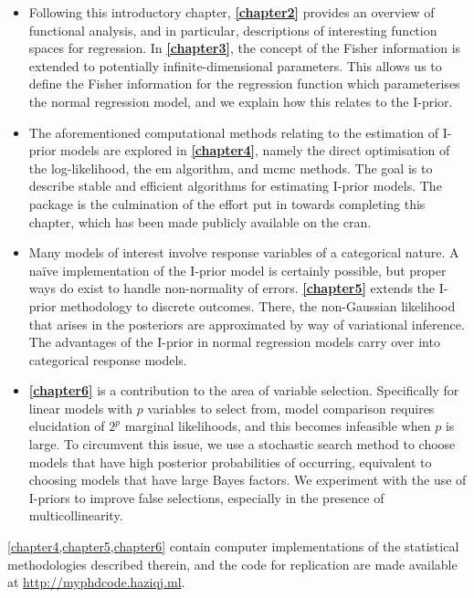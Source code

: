 \documentclass[11pt,twoside,openright,showframe]{report}
\begin{document}
\begin{itemize}
  \item Following this introductory chapter, \textbf{\cref{chapter2}} provides an overview of functional analysis, and in particular, descriptions of interesting function spaces for regression.
  In \textbf{\cref{chapter3}}, the concept of the Fisher information is extended to potentially infinite-dimensional parameters.
  This allows us to define the Fisher information for the regression function which parameterises the normal regression model, and we explain how this relates to the I-prior.
  
  \item The aforementioned computational methods relating to the estimation of I-prior models are explored in \textbf{\cref{chapter4}}, namely the direct optimisation of the log-likelihood, the \gls*{em} algorithm, and \gls*{mcmc} methods.
  The goal is to describe stable and efficient algorithms for estimating I-prior models.
  The  package  \citep{jamil2017iprior} is the culmination of the effort put in towards completing this chapter, which has been made publicly available on the \gls*{cran}.

  \item Many models of interest involve response variables of a categorical nature.
  A naïve implementation of the I-prior model is certainly possible, but proper ways do exist to handle non-normality of errors.
  \textbf{\cref{chapter5}} extends the I-prior methodology to discrete outcomes.
  There, the non-Gaussian likelihood that arises in the posteriors are approximated by way of variational inference.
  The advantages of the I-prior in normal regression models carry over into categorical response models.

  \item \textbf{\cref{chapter6}} is a contribution to the area of variable selection.
  Specifically for linear models with $p$ variables to select from, model comparison requires elucidation of $2^p$ marginal likelihoods, and this becomes infeasible when $p$ is large.
  To circumvent this issue, we use a stochastic search method to choose models that have high posterior probabilities of occurring, equivalent to choosing models that have large Bayes factors.
  We experiment with the use of I-priors to improve false selections, especially in the presence of multicollinearity.
\end{itemize}

\cref{chapter4,chapter5,chapter6} contain  computer implementations of the statistical methodologies described therein, and the code for replication are made available at \url{http://myphdcode.haziqj.ml}.
\end{document}
